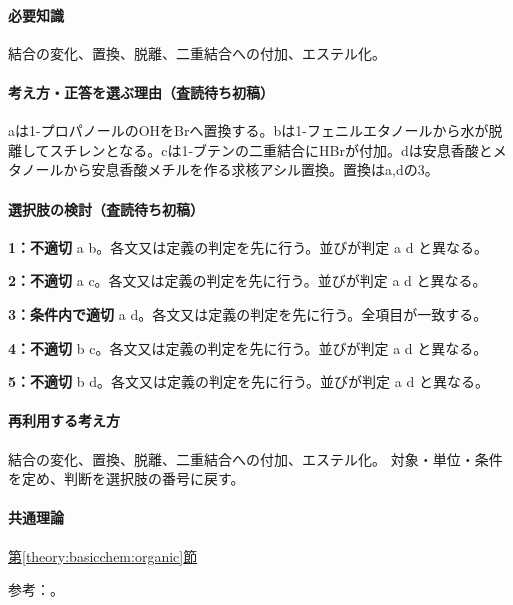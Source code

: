 \paragraph{必要知識} 結合の変化、置換、脱離、二重結合への付加、エステル化。

\paragraph{考え方・正答を選ぶ理由（査読待ち初稿）} aは1-プロパノールのOHをBrへ置換する。bは1-フェニルエタノールから水が脱離してスチレンとなる。cは1-ブテンの二重結合にHBrが付加。dは安息香酸とメタノールから安息香酸メチルを作る求核アシル置換。置換はa,dの3。

\paragraph{選択肢の検討（査読待ち初稿）}\mbox{}\par

\noindent\textbf{1：不適切} a b。各文又は定義の判定を先に行う。並びが判定 a d と異なる。\par

\noindent\textbf{2：不適切} a c。各文又は定義の判定を先に行う。並びが判定 a d と異なる。\par

\noindent\textbf{3：条件内で適切} a d。各文又は定義の判定を先に行う。全項目が一致する。\par

\noindent\textbf{4：不適切} b c。各文又は定義の判定を先に行う。並びが判定 a d と異なる。\par

\noindent\textbf{5：不適切} b d。各文又は定義の判定を先に行う。並びが判定 a d と異なる。\par

\paragraph{再利用する考え方} 結合の変化、置換、脱離、二重結合への付加、エステル化。 対象・単位・条件を定め、判断を選択肢の番号に戻す。

\paragraph{共通理論} \hyperref[theory:basicchem:organic]{第\ref*{theory:basicchem:organic}節}

\par 参考：\cite{chem55_organic}。

